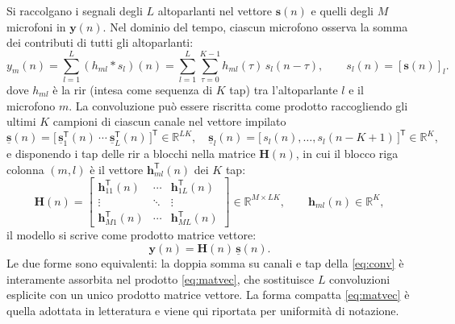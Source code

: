 \documentclass[11pt,a4paper]{article}
\begin{document}
	Si raccolgano i segnali degli $L$ altoparlanti nel vettore $\mathbf{s}(n)$ e quelli degli $M$ microfoni in $\mathbf{y}(n)$. Nel dominio del tempo, ciascun microfono osserva la somma dei contributi di tutti gli altoparlanti:
	\begin{equation}
		y_m(n) = \sum_{l=1}^{L} \left(h_{ml}*s_l\right)(n)
		= \sum_{l=1}^{L} \sum_{\tau=0}^{K-1} h_{ml}(\tau)\, s_l(n-\tau),
		\qquad s_l(n)=[\mathbf{s}(n)]_l.
		\label{eq:conv}
	\end{equation}
	dove $h_{ml}$ è la \ac{rir} (intesa come sequenza di $K$ tap) tra l'altoparlante $l$ e il microfono $m$.
	La convoluzione può essere riscritta come prodotto raccogliendo gli ultimi $K$ campioni di ciascun canale nel vettore impilato
	\begin{equation}
		\underline{\mathbf{s}}(n) =
		\big[\,\underline{\mathbf{s}}_1^{\mathsf{T}}(n)\ \cdots\ \underline{\mathbf{s}}_L^{\mathsf{T}}(n)\,\big]^{\mathsf{T}} \in \mathbb{R}^{LK},
		\quad
		\underline{\mathbf{s}}_l(n) = \big[\,s_l(n),\dots,s_l(n-K+1)\,\big]^{\mathsf{T}} \in \mathbb{R}^{K},
	\end{equation}
	e disponendo i tap delle \ac{rir} a blocchi nella matrice $\mathbf{H}(n)$, in cui il blocco riga colonna $(m,l)$ è il vettore $\mathbf{h}_{ml}^{\mathsf{T}}(n)$ dei $K$ tap:
	\begin{equation}
		\mathbf{H}(n) =
		\begin{bmatrix}
			\mathbf{h}_{11}^{\mathsf{T}}(n) & \cdots & \mathbf{h}_{1L}^{\mathsf{T}}(n) \\
			\vdots & \ddots & \vdots \\
			\mathbf{h}_{M1}^{\mathsf{T}}(n) & \cdots & \mathbf{h}_{ML}^{\mathsf{T}}(n)
		\end{bmatrix}
		\in \mathbb{R}^{M\times LK},
		\qquad \mathbf{h}_{ml}(n)\in\mathbb{R}^{K},
	\end{equation}
	il modello si scrive come prodotto matrice vettore:
	\begin{equation}
		\mathbf{y}(n) = \mathbf{H}(n)\,\underline{\mathbf{s}}(n).
		\label{eq:matvec}
	\end{equation}
	Le due forme sono equivalenti: la doppia somma su canali e tap della \eqref{eq:conv} è interamente assorbita nel prodotto \eqref{eq:matvec}, che sostituisce $L$ convoluzioni esplicite con un unico prodotto matrice vettore. La forma compatta \eqref{eq:matvec} è quella adottata in letteratura \cite{11464373} e viene qui riportata per uniformità di notazione.
	
\end{document}
